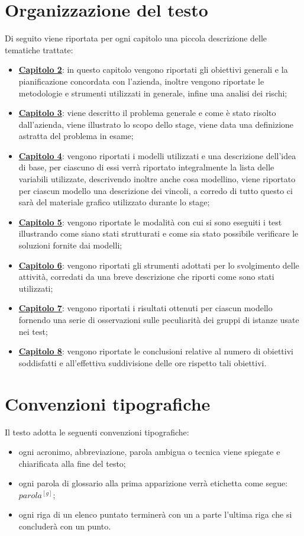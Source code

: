 \section{Organizzazione del testo}
Di seguito viene riportata per ogni capitolo una piccola descrizione delle tematiche trattate:
\begin{itemize}
	\item \hyperlink{(chap:capitolo2)}{\textbf{Capitolo 2}}: in questo capitolo vengono riportati gli obiettivi generali e la pianificazione concordata con l'azienda, inoltre vengono riportate le metodologie e strumenti utilizzati in generale, infine una analisi dei rischi;
	\item \hyperlink{(chap:capitolo3)}{\textbf{Capitolo 3}}: viene descritto il problema generale e come è stato risolto dall'azienda, viene illustrato lo scopo dello stage, viene data una definizione astratta del problema in esame;
	\item \hyperlink{(chap:capitolo4)}{\textbf{Capitolo 4}}: vengono riportati i modelli utilizzati e una descrizione dell'idea di base, per ciascuno di essi verrà riportato integralmente la lista delle variabili utilizzate, descrivendo inoltre anche cosa modellino, viene riportato per ciascun modello una descrizione dei vincoli, a corredo di tutto questo ci sarà del materiale grafico utilizzato durante lo stage;
	\item \hyperlink{(chap:capitolo5)}{\textbf{Capitolo 5}}: vengono riportate le modalità con cui si sono eseguiti i test illustrando come siano stati strutturati e come sia stato possibile verificare le soluzioni fornite dai modelli;
	\item \hyperlink{(chap:capitolo6)}{\textbf{Capitolo 6}}: vengono riportati gli strumenti adottati per lo svolgimento delle attività, corredati da una breve descrizione che riporti come sono stati utilizzati;
	\item \hyperlink{(chap:capitolo7)}{\textbf{Capitolo 7}}: vengono riportati i risultati ottenuti per ciascun modello fornendo una serie di osservazioni sulle peculiarità dei gruppi di istanze usate nei test;
	\item \hyperlink{(chap:capitolo8)}{\textbf{Capitolo 8}}: vengono riportate le conclusioni relative al numero di obiettivi soddisfatti e all'effettiva suddivisione delle ore rispetto tali obiettivi.

\end{itemize}
\section{Convenzioni tipografiche}
Il testo adotta le seguenti convenzioni tipografiche:
\begin{itemize}
	\item ogni acronimo, abbreviazione, parola ambigua o tecnica viene spiegate e chiarificata alla fine del testo;
	\item ogni parola di glossario alla prima apparizione verrà etichetta come segue: $parola^{[g]}$;
	\item ogni riga di un elenco puntato terminerà con un \; a parte l'ultima riga che si concluderà con un punto.
\end{itemize}
